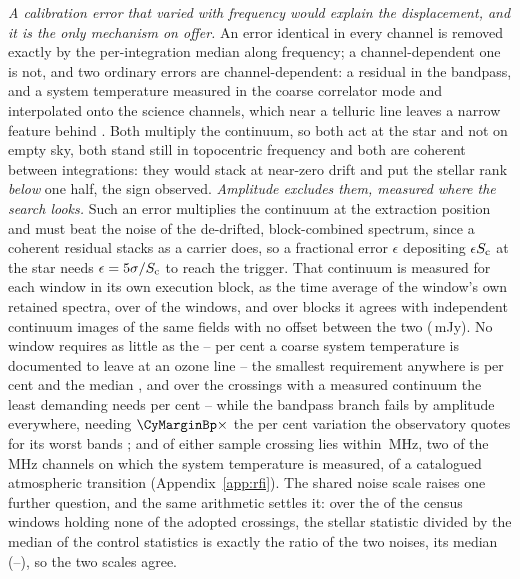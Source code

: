 \emph{A calibration error that varied with frequency would explain the
displacement, and it is the only mechanism on offer.} An error identical in
every channel is removed exactly by the per-integration median along
frequency; a channel-dependent one is not, and two ordinary errors are
channel-dependent: a residual in the bandpass, and a system temperature
measured in the coarse correlator mode and interpolated onto the science
channels, which near a telluric line leaves a narrow feature behind
\citep{ALMATsys2018}. Both multiply the continuum, so both act at the star and
not on empty sky, both stand still in topocentric frequency and both are
coherent between integrations: they would stack at near-zero drift and put the
stellar rank \emph{below} one half, the sign observed.
\emph{Amplitude excludes them, measured where the search looks.} Such an
error multiplies the continuum at the extraction position and must beat the
noise of the de-drifted, block-combined spectrum, since a coherent residual
stacks as a carrier does, so a fractional error $\epsilon$ depositing
$\epsilon S_{\rm c}$ at the star needs $\epsilon=5\sigma/S_{\rm c}$ to reach
the trigger. That continuum is measured for each window in its own execution
block, as the time average of the window's own retained spectra, over
\CyNWinMeas{} of the \CyNWinTot{} windows, and over \CyNRouteBlock{} blocks it
agrees with independent continuum images of the same fields with no offset
between the two (\CyRouteBiasMJy\,mJy). No window requires as little as the
\CySpecTsysLo--\CySpecTsysHi{} per cent a coarse system temperature is
documented to leave at an ozone line -- the smallest requirement anywhere is
\CyEpsMinPct{} per cent and the median \CyEpsMedPct, and over the
\CyNCrossMeas{} crossings with a measured continuum the least demanding needs
\CyCrossEpsLoPct{} per cent -- while the bandpass branch fails by amplitude
everywhere, needing $\CyMarginBp\times$ the \CdSpecBpWorst{} per cent
variation the observatory quotes for its worst bands
\citep{ALMAKBBandpass,ALMATechNote15}; and of either sample \ScNInRad{}
crossing lies within \ScRadMHz\,MHz, two of the \CdSpecTsysRes\,MHz channels
on which the system temperature is measured, of a catalogued atmospheric
transition (Appendix~\ref{app:rfi}). The shared noise scale raises one further
question, and the same arithmetic settles it: over the \NsrNWin{} of the
\NWindows{} census windows holding none of the adopted crossings, the stellar
statistic divided by the median of the \NCtrl{} control statistics is exactly
the ratio of the two noises, its median \NsrMed{} (\NsrLo--\NsrHi), so the two
scales agree.

